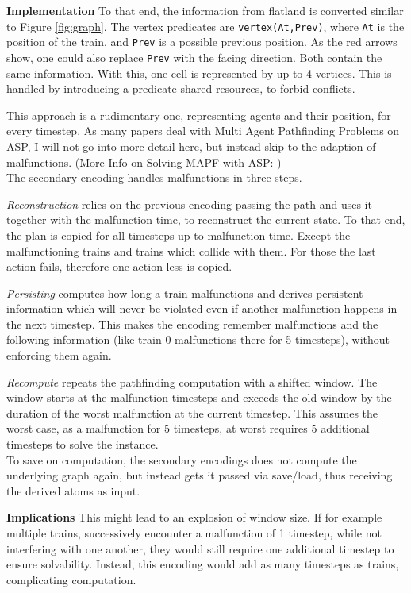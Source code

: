 \noindent \textbf{Implementation} To that end, the information from flatland is converted similar to Figure \ref{fig:graph}. The vertex predicates are \texttt{vertex(At,Prev)}, where \texttt{At} is the position of the train, and \texttt{Prev} is a possible previous position. As the red arrows show, one could also replace \texttt{Prev} with the facing direction. Both contain the same information. With this, one cell is represented by up to 4 vertices. This is handled by introducing a predicate shared resources, to forbid conflicts.

This approach is a rudimentary one, representing agents and their position, for every timestep. As many papers deal with Multi Agent Pathfinding Problems on ASP, I will not go into more detail here, but instead skip to the adaption of malfunctions. (More Info on Solving MAPF with ASP: \cite{MAPF})\\

\noindent The secondary encoding handles malfunctions in three steps.

\textit{Reconstruction} relies on the previous encoding passing the path and uses it together with the malfunction time, to reconstruct the current state. To that end, the plan is copied for all timesteps up to malfunction time. Except the malfunctioning trains and trains which collide with them. For those the last action fails, therefore one action less is copied. 

\textit{Persisting} computes how long a train malfunctions and derives persistent information which will never be violated even if another malfunction happens in the next timestep. This makes the encoding remember malfunctions and the following information (like train 0 malfunctions there for 5 timesteps), without enforcing them again.

\textit{Recompute} repeats the pathfinding computation with a shifted window. The window starts at the malfunction timesteps and exceeds the old window by the duration of the worst malfunction at the current timestep. This assumes the worst case, as a malfunction for 5 timesteps, at worst requires 5 additional timesteps to solve the instance.\\

To save on computation, the secondary encodings does not compute the underlying graph again, but instead gets it passed via save/load, thus receiving the derived atoms as input.

\noindent \textbf{Implications} This might lead to an explosion of window size. If for example multiple trains, successively encounter a malfunction of 1 timestep, while not interfering with one another, they would still require one additional timestep to ensure solvability. Instead, this encoding would add as many timesteps as trains, complicating computation.

